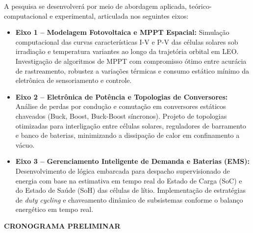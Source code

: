 \noindent A pesquisa se desenvolverá por meio de abordagem aplicada, teórico-computacional e experimental, articulada nos seguintes eixos:
\begin{itemize}[leftmargin=*]
    \item \textbf{Eixo 1 -- Modelagem Fotovoltaica e MPPT Espacial:} Simulação computacional das curvas características I-V e P-V das células solares sob irradiação e temperatura variantes ao longo da trajetória orbital em LEO. Investigação de algoritmos de MPPT com compromisso ótimo entre acurácia de rastreamento, robustez a variações térmicas e consumo estático mínimo da eletrônica de sensoriamento e controle.
    \item \textbf{Eixo 2 -- Eletrônica de Potência e Topologias de Conversores:} Análise de perdas por condução e comutação em conversores estáticos chaveados (Buck, Boost, Buck-Boost síncronos). Projeto de topologias otimizadas para interligação entre células solares, reguladores de barramento e banco de baterias, minimizando a dissipação de calor em confinamento a vácuo.
    \item \textbf{Eixo 3 -- Gerenciamento Inteligente de Demanda e Baterias (EMS):} Desenvolvimento de lógica embarcada para despacho supervisionado de energia com base na estimativa em tempo real do Estado de Carga (SoC) e do Estado de Saúde (SoH) das células de lítio. Implementação de estratégias de \textit{duty cycling} e chaveamento dinâmico de subsistemas conforme o balanço energético em tempo real.
\end{itemize}

\vspace{0.3cm}
\noindent\textbf{CRONOGRAMA PRELIMINAR}

